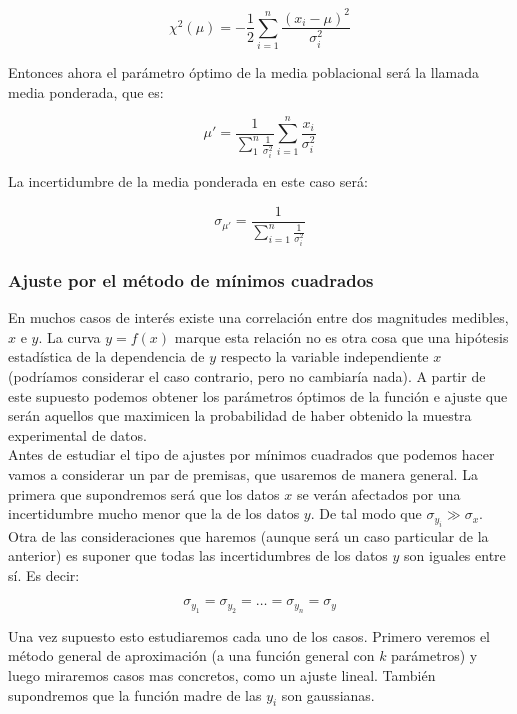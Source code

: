 \documentclass[12pt,a4paper]{book}
\begin{document}
\begin{equation}
\chi^2(\mu)= -\dfrac{1}{2} \sum_{i=1}^n \dfrac{(x_i - \mu)^2}{\sigma_i^2}
\end{equation}

Entonces ahora el parámetro óptimo de la media poblacional será la llamada media ponderada, que es: 

\begin{equation}
\mu ' = \frac{1}{\sum_1^n \frac{1}{\sigma_i^2}} \sum_{i=1}^n \dfrac{x_i}{\sigma_i^2}
\end{equation}

La incertidumbre de la media ponderada en este caso será:

\begin{equation}
\sigma_{\mu'} = \dfrac{1}{\sum_{i=1}^n \frac{1}{\sigma_i^2}}
\end{equation}

\subsubsection{Ajuste por el método de mínimos cuadrados}
En muchos casos de interés existe una correlación entre dos magnitudes medibles, $x$ e $y$. La curva $y=f(x)$ marque esta relación no es otra cosa que una hipótesis estadística de la dependencia de $y$ respecto la variable independiente $x$ (podríamos considerar el caso contrario, pero no cambiaría nada). A partir de este supuesto podemos obtener los parámetros óptimos de la función e ajuste que serán aquellos que maximicen la probabilidad de haber obtenido la muestra experimental de datos. \\ 

Antes de estudiar el tipo de ajustes por mínimos cuadrados que podemos hacer vamos a considerar un par de premisas, que usaremos de manera general. La primera que supondremos será que los datos $x$ se verán afectados por una incertidumbre mucho menor que la de los datos $y$. De tal modo que $\sigma_{y_i} \gg \sigma_x$. Otra de las consideraciones que haremos (aunque será un caso particular de la anterior) es suponer que todas las incertidumbres de los datos $y$ son iguales entre sí. Es decir:

$$ \sigma_{y_1} = \sigma_{y_2} = \ldots = \sigma_{y_n} = \sigma_y  $$

Una vez supuesto esto estudiaremos cada uno de los casos. Primero veremos el método general de aproximación (a una función general con $k$ parámetros) y luego miraremos casos mas concretos, como un ajuste lineal. También supondremos que la función madre de las $y_i$ son gaussianas.  \\
\end{document}
